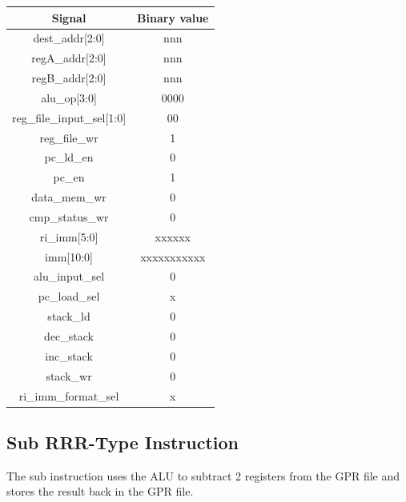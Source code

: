 \documentclass{article}
\begin{document}
\begin{par}
	\begin{center}
		\begin{tabular}{|c|c|}
			\hline 
			\textbf{Signal} & \textbf{Binary value} \\ 
			\hline 
			dest\_addr[2:0] & nnn \\ 
			\hline 
			regA\_addr[2:0] & nnn \\ 
			\hline 
			regB\_addr[2:0] & nnn \\ 
			\hline 
			alu\_op[3:0] & 0000 \\ 
			\hline 
			reg\_file\_input\_sel[1:0] & 00 \\ 
			\hline 
			reg\_file\_wr & 1 \\ 
			\hline 
			pc\_ld\_en & 0 \\ 
			\hline 
			pc\_en & 1 \\ 
			\hline 
			data\_mem\_wr & 0 \\ 
			\hline 
			cmp\_status\_wr & 0 \\ 
			\hline 
			ri\_imm[5:0] & xxxxxx \\ 
			\hline 
			imm[10:0] & xxxxxxxxxxx \\ 
			\hline 
			alu\_input\_sel & 0 \\ 
			\hline 
			pc\_load\_sel & x \\ 
			\hline 
			stack\_ld & 0 \\ 
			\hline 
			dec\_stack & 0 \\ 
			\hline 
			inc\_stack & 0 \\ 
			\hline 
			stack\_wr & 0 \\ 
			\hline 
			ri\_imm\_format\_sel & x \\ 
			\hline 
		\end{tabular} 
	\end{center}

	\newpage
	\subsection{Sub RRR-Type Instruction}
	
	The sub instruction uses the ALU to subtract 2 registers from the GPR file and stores the result back in the GPR file. \\
	

\end{par}
\end{document}

